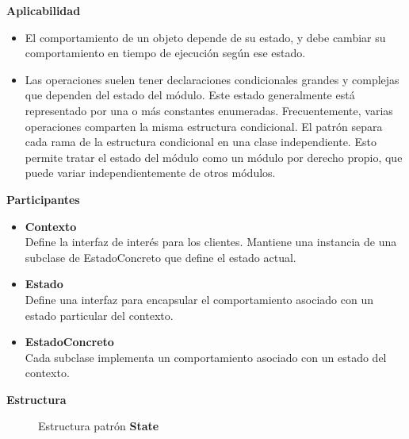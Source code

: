 \textbf{Aplicabilidad}

\begin{itemize}
\item El comportamiento de un objeto depende de su estado, y debe cambiar su comportamiento en tiempo de ejecución según ese estado.
\item Las operaciones suelen tener declaraciones condicionales grandes y complejas que dependen del estado del módulo. Este estado generalmente está representado por una o más constantes enumeradas. Frecuentemente, varias operaciones comparten la misma estructura condicional. El patrón separa cada rama de la estructura condicional en una clase independiente. Esto permite tratar el estado del módulo como un módulo por derecho propio, que puede variar independientemente de otros módulos.
\end{itemize}

\textbf{Participantes}

\begin{itemize}
\item \textbf{Contexto}\\
Define la interfaz de interés para los clientes. Mantiene una instancia de una subclase de EstadoConcreto que define el estado actual.

\item \textbf{Estado}\\
Define una interfaz para encapsular el comportamiento asociado con un estado particular del contexto.

\item \textbf{EstadoConcreto}\\
Cada subclase implementa un comportamiento asociado con un estado del contexto.
\end{itemize}


\textbf{Estructura}

\begin{figure}[h]
\caption{Estructura patrón \textbf{State}}
\begin{center}
\end{center}
\end{figure}

